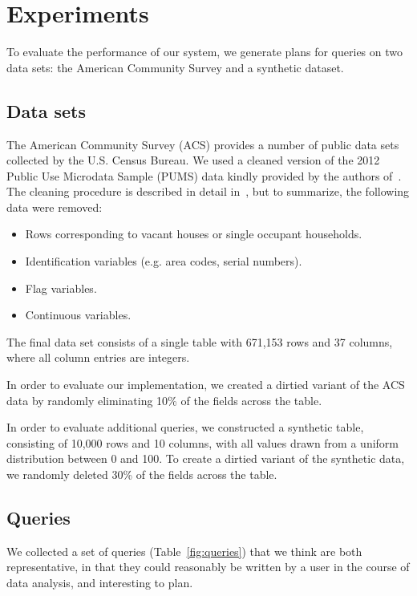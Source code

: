 \section{Experiments}
To evaluate the performance of our system, we generate plans for queries on two data sets: the American Community Survey and a synthetic dataset.
\subsection{Data sets} \label{subsec:datasets}

The American Community Survey (ACS) provides a number of public data sets collected by the U.S. Census Bureau.
We used a cleaned version of the 2012 Public Use Microdata Sample (PUMS) data kindly provided by the authors of~\cite{akande2015empirical}.
The cleaning procedure is described in detail in~\cite{akande2015empirical}, but to summarize, the following data were removed:
\begin{itemize}
\item Rows corresponding to vacant houses or single occupant households.
\item Identification variables (e.g. area codes, serial numbers).
\item Flag variables.
\item Continuous variables.
\end{itemize}
The final data set consists of a single table with 671,153 rows and 37 columns, where all column entries are integers.

In order to evaluate our implementation, we created a dirtied variant of the ACS data by randomly eliminating
10\% of the fields across the table.

In order to evaluate additional queries, we constructed a synthetic table, consisting of 10,000 rows and 10 columns, with
all values drawn from a uniform distribution between 0 and 100. To create a dirtied variant of the synthetic data, we randomly deleted 30\% of the fields
across the table.

\subsection{Queries}

We collected a set of queries (Table~\ref{fig:queries}) that we think are both representative, in that they could reasonably be written by a user in the course of data analysis, and interesting to plan.

